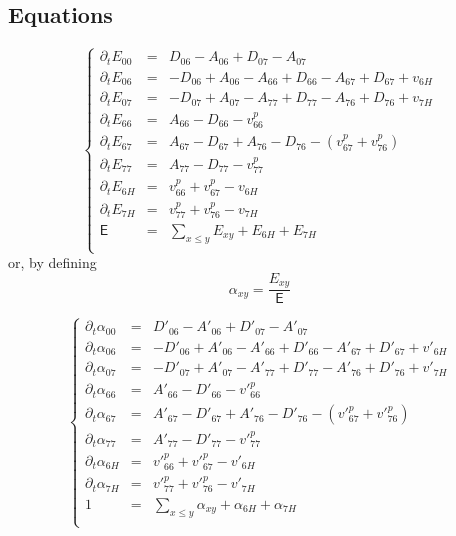 \documentclass[aps,onecolumn,11pt]{revtex4}
\begin{document}
\subsection{Equations}
\begin{equation}
\left\lbrace
\begin{array}{rcl}
\partial_t E_{00} & = & D_{06}-A_{06} + D_{07}-A_{07}\\
\partial_t E_{06} & = & -D_{06}+A_{06} - A_{66} + D_{66} - A_{67} + D_{67} + v_{6H}\\
\partial_t E_{07} & = & -D_{07}+A_{07} - A_{77} + D_{77} - A_{76} + D_{76} + v_{7H}\\
\partial_t E_{66} & = & A_{66}-D_{66} -v^p_{66}\\
\partial_t E_{67} & = & A_{67}-D_{67} + A_{76}-D_{76} - (v^p_{67}+v^p_{76})\\
\partial_t E_{77} & = & A_{77}-D_{77} - v^p_{77}\\
\partial_t E_{6H} & = & v^p_{66}+v^p_{67} - v_{6H}\\
\partial_t E_{7H} & = & v^p_{77}+v^p_{76} - v_{7H}\\
\mathsf{E}      & = & {\displaystyle \sum_{x\leq y} E_{xy}}+E_{6H}+E_{7H}\\
\end{array}
\right.
\end{equation}
or, by defining
\begin{equation}
	\alpha_{xy} = \dfrac{E_{xy}}{\mathsf{E}}
\end{equation}

\begin{equation}
\left\lbrace
\begin{array}{rcl}
\partial_t \alpha_{00} & = & D'_{06}-A'_{06} + D'_{07}-A'_{07}\\
\partial_t \alpha_{06} & = & -D'_{06}+A'_{06} - A'_{66} + D'_{66} - A'_{67} + D'_{67} + v'_{6H}\\
\partial_t \alpha_{07} & = & -D'_{07}+A'_{07} - A'_{77} + D'_{77} - A'_{76} + D'_{76} + v'_{7H}\\
\partial_t \alpha_{66} & = & A'_{66}-D'_{66} -v'^p_{66}\\
\partial_t \alpha_{67} & = & A'_{67}-D'_{67} + A'_{76}-D'_{76} - (v'^p_{67}+v'^p_{76})\\
\partial_t \alpha_{77} & = & A'_{77}-D'_{77} - v'^p_{77}\\
\partial_t \alpha_{6H} & = & v'^p_{66}+v'^p_{67} - v'_{6H}\\
\partial_t \alpha_{7H} & = & v'^p_{77}+v'^p_{76} - v'_{7H}\\
1      & = & {\displaystyle \sum_{x\leq y} \alpha_{xy}}+\alpha_{6H}+\alpha_{7H}\\
\end{array}
\right.
\end{equation}
\end{document}
